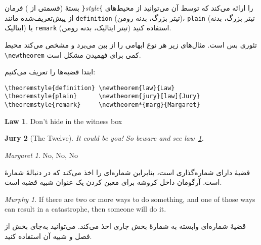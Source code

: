 بستۀ  (قسمتی از \lr{\AmS-\LaTeX}) 
فرمان \verb|}|\emph{style}\verb|{|
را ارائه می‌کند که توسط آن می‌توانید از محیط‌های از پیش‌تعریف‌شده  مانند \texttt{definition} (تیتر بزرگ، بدنه رومن)،
\texttt{plain} (تیتر بزرگ، بدنه ایتالیک) 
یا \texttt{remark} (تیتر ایتالیک، بدنه رومن) 
استفاده کنید.

تئوری بس است. مثال‌های زیر هر نوع ابهامی را از بین می‌برد و مشخص می‌کند محیط 
\verb|\newtheorem| کمی برای فهمیدن مشکل است.

\begin{latin}
\theoremstyle{definition} \newtheorem{law}{Law}
\theoremstyle{plain}      \newtheorem{jury}[law]{Jury}
\theoremstyle{remark}     \newtheorem*{marg}{Margaret}
\end{latin}

ابتدا قضیه‌ها را تعریف می‌کنیم:
\begin{latin}
\begin{verbatim}
\theoremstyle{definition} \newtheorem{law}{Law}
\theoremstyle{plain}      \newtheorem{jury}[law]{Jury}
\theoremstyle{remark}     \newtheorem*{marg}{Margaret}
\end{verbatim}
\end{latin}


\begin{example}
\begin{law} \label{law:box}
Don't hide in the witness box
\end{law}
\begin{jury}[The Twelve]
It could be you! So beware and
see law~\ref{law:box}.\end{jury}
\begin{marg}No, No, No\end{marg}
\end{example}


قضیهٔ  دارای شماره‌گذاری  است، بنابراین شماره‌ای را اخذ می‌کند که در دنبالهٔ شمارهٔ  است.  آرگومان داخل کروشه برای معین کردن یک عنوان شبیه قضیه است.


\begin{example}
\newtheorem{mur}{Murphy}[section]


\begin{mur} If there are two or 
more ways to do something, and 
one of those ways can result in
a catastrophe, then someone 
will do it.\end{mur}
\end{example}



قضیهٔ  شماره‌ای وابسته به شمارهٔ بخش جاری اخذ می‌کند. می‌توانید به‌جای بخش از فصل و شبیه آن استفاده کنید.

